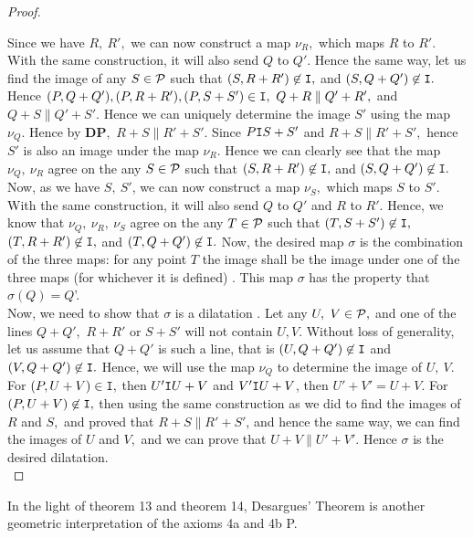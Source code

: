 \begin{proof}
    \begin{center}
    \end{center}

    Since we have $R, \ R',$ we can now construct a map $\nu_R,$ which maps $R$ to $R'.$ With the same construction, it will also send $Q$ to $Q'.$ Hence the same way, let us find the image of any $S \in \mathcal{P}$ such that $(S, R+R') \not \in \texttt{I},$ and $(S, Q+Q') \not \in \texttt{I}.$ Hence $(P, Q+Q'), (P,R+R'), (P,S+S') \in \texttt{I},  \ Q+R \parallel Q'+R',$ and $Q+S \parallel Q'+S'.$  Hence we can uniquely determine the image $S'$ using the map $\nu_Q.$ Hence by $\mathbf{DP},$ $R+S \parallel  R'+S'.$ Since $P\texttt{I} S+S'$ and $R+S \parallel  R'+S',$ hence $S'$ is also an image under the map $\nu_R$. Hence we can clearly see that the map $\nu_Q, \ \nu_R$ agree on the any $S \in \mathcal{P}$ such that $(S, R+R') \not \in \texttt{I},$ and $(S, Q+Q') \not \in \texttt{I}.$ Now, as we have $S, \ S'$, we can now construct a map $\nu_S,$ which maps $S$ to $S'.$ With the same construction, it will also send $Q$ to $Q'$ and $R$ to $R'.$ Hence, we know that $\nu_Q, \ \nu_R, \  \nu_S$ agree on the any $T \in \mathcal{P}$ such that $(T, S+S') \not \in \texttt{I},$ $(T, R+R') \not \in \texttt{I},$ and $(T, Q+Q') \not \in \texttt{I}.$ Now, the desired map $\sigma$ is the combination of the three maps: for any point $T$ the image shall be the image under one of the three maps (for whichever it is defined) . This map $\sigma$ has the property that $\sigma(Q ) = Q$'. \\
    
    Now, we need to show that $\sigma$ is a dilatation .  Let any $U, \ V \in \mathcal{P},$ and one of the lines $Q+Q',$ $R+R'$ or $S+S'$ will not contain $U, V.$ Without loss of generality, let us assume that $Q+Q'$ is such a line, that is $(U,Q+Q') \not \in \texttt{I}$ and $(V, Q+Q') \not \in \texttt{I}.$ Hence, we will use the map $\nu_Q$ to determine the image of $U, \ V.$ For $(P, U+V) \in \texttt{I},$ then $U'\texttt{I} U+V $ and $ V' \texttt{I} U+V $, then  $U'+V'=U+V.$ For $(P, U+V) \not \in \texttt{I},$ then using the same construction as we did to find the images of $R$ and $S,$ and proved that $R+S \parallel R'+S'$, and hence the same way, we can find the images of $U$ and $V,$ and we can prove that $U+V \parallel U'+V'.$ Hence $\sigma$ is the desired dilatation. \\
    
\end{proof}

In the light of theorem 13 and theorem 14, Desargues' Theorem is another geometric interpretation of the axioms 4a and 4b P.

